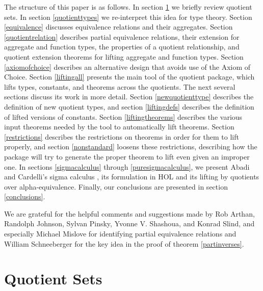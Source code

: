 \documentclass[envcountsame,runningheads]{llncs}
\newcommand{\quotient}{partial equivalence}
\begin{document}
The structure of this paper is as follows.  In section \ref{quotientsets}
we briefly review quotient sets.  In section \ref{quotienttypes} we
re-interpret this idea for type theory. 
Section \ref{equivalence} discusses equivalence relations and their
aggregates.
Section \ref{quotientrelation} describes \quotient{} relations,
their extension for aggregate and function types,
the properties of a quotient relationship,
and quotient extension theorems
for lifting aggregate and function types.
Section \ref{axiomofchoice} describes an alternative design
that avoids use of the Axiom of Choice.
Section \ref{liftingall} presents
the main tool of the quotient package, which lifts types, constants,
and theorems across the quotients.
The next several sections discuss
its work
in more detail.
Section \ref{newquotienttype}
describes the definition of new quotient types, and 
section \ref{liftingdefs} describes the definition of lifted versions
of constants.
Section \ref{liftingtheorems} describes the various input theorems needed by
the tool to automatically lift theorems.
Section \ref{restrictions} describes the restrictions on theorems
in order for them to lift properly, and section 
\ref{nonstandard} loosens these restrictions, describing how the
package will try to generate the proper theorem to lift
even given an improper one.
In sections \ref{sigmacalculus} through 
\ref{puresigmacalculus}, we present Abadi and Cardelli's sigma calculus
\cite{AbCa96},
its formulation in HOL and its lifting by quotients over alpha-equivalence.
Finally, our conclusions are presented in section \ref{conclusions}.

We are grateful for the helpful comments and
suggestions made by
Rob Arthan,
Randolph Johnson,
Sylvan Pinsky,
Yvonne V. Shashoua,
and
Konrad Slind,
and especially Michael Mislove for identifying
partial equivalence relations and
William Schneeberger for the key idea in the proof of theorem
\ref{partinverses}.


%
\section{Quotient Sets}
%
\label{quotientsets}
\end{document}
